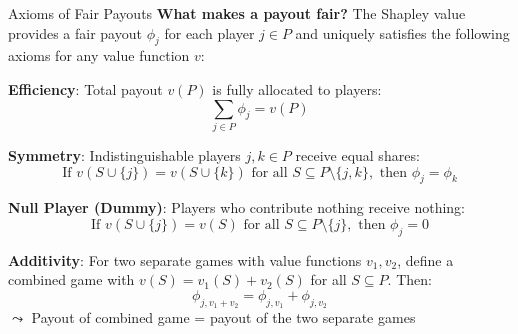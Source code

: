 \documentclass[10pt,compress,t,notes=noshow, xcolor=table]{beamer}
\begin{document}
\begin{framev}[align=top]{Axioms of Fair Payouts}
\textbf{What makes a payout fair?} The Shapley value provides a fair payout $\phi_j$ for each player $j \in P$ and uniquely satisfies the following axioms for any value function $v$:\\
\spacer[0.25]
\begin{itemizeM}
\item<+-> \textbf{Efficiency}: Total payout $v(P)$ is fully allocated to players:
$$
\textstyle \sum_{j \in P} \phi_j = v(P)
$$
\item<+-> \textbf{Symmetry}: Indistinguishable players $j,k \in P$ receive equal shares:
$$
\text{If } v(S \cup \{j\}) = v(S \cup \{k\}) \text{ for all } S \subseteq P \setminus \{j,k\}, \text{ then } \phi_j = \phi_k
$$
\item<+-> \textbf{Null Player (Dummy)}: Players who contribute nothing receive nothing:
$$
\text{If } v(S \cup \{j\}) = v(S) \text{ for all } S \subseteq P \setminus \{j\}, \text{ then } \phi_j = 0
$$
\item<+-> \textbf{Additivity}: For two separate games with value functions $v_1, v_2$, define a combined game with $v(S) = v_1(S) + v_2(S)$ for all $S \subseteq P$. Then:
$$
\phi_{j, v_1 + v_2} = \phi_{j, v_1} + \phi_{j, v_2}
$$
$\leadsto$ Payout of combined game = payout of the two separate games
\end{itemizeM}
\end{framev}





      

  
\end{document}
